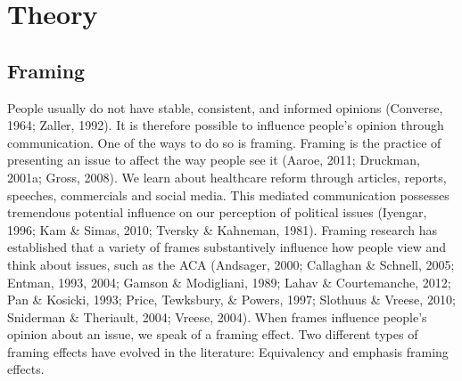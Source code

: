 \documentclass[12pt,econ]{sources/authesis}
\begin{document}
\hypertarget{framing-theory}{%
\section{Theory}\label{framing-theory}}

\hypertarget{framing-theory-framing}{%
\subsection{Framing}\label{framing-theory-framing}}

People usually do not have stable, consistent, and informed opinions (Converse, 1964; Zaller, 1992). It is therefore possible to influence people's opinion through communication. One of the ways to do so is framing. Framing is the practice of presenting an issue to affect the way people see it (Aaroe, 2011; Druckman, 2001a; Gross, 2008). We learn about healthcare reform through articles, reports, speeches, commercials and social media. This mediated communication possesses tremendous potential influence on our perception of political issues (Iyengar, 1996; Kam \& Simas, 2010; Tversky \& Kahneman, 1981). Framing research has established that a variety of frames substantively influence how people view and think about issues, such as the ACA (Andsager, 2000; Callaghan \& Schnell, 2005; Entman, 1993, 2004; Gamson \& Modigliani, 1989; Lahav \& Courtemanche, 2012; Pan \& Kosicki, 1993; Price, Tewksbury, \& Powers, 1997; Slothuus \& Vreese, 2010; Sniderman \& Theriault, 2004; Vreese, 2004). When frames influence people's opinion about an issue, we speak of a framing effect. Two different types of framing effects have evolved in the literature: Equivalency and emphasis framing effects.
\end{document}
